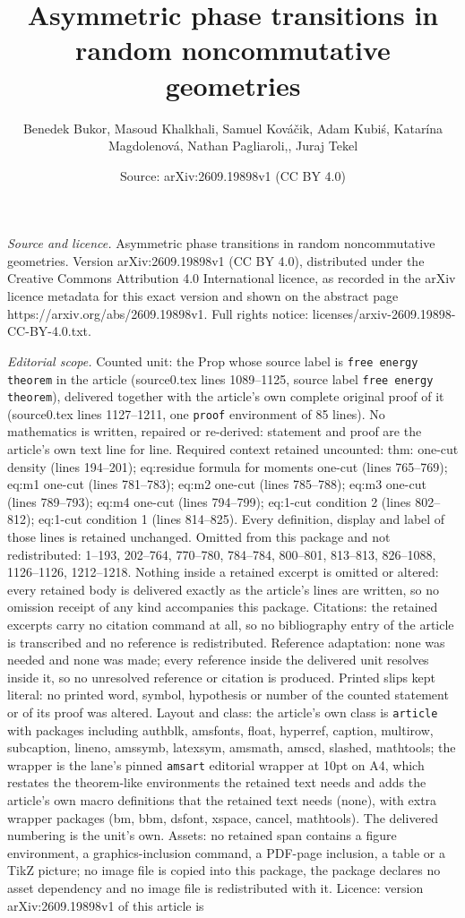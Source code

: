 \documentclass[10pt,a4paper]{amsart}
\title[Asymmetric phase transitions in random noncommutative geomet]{Asymmetric phase transitions in random noncommutative geometries}
\author{Benedek Bukor, Masoud Khalkhali, Samuel Kov\'a\v{c}ik, Adam Kubi\'s, Katar\'ina Magdolenov\'a, Nathan Pagliaroli,, Juraj Tekel}
\date{Source: arXiv:2609.19898v1 (CC BY 4.0)}
\begin{document}
\maketitle

\noindent\emph{Source and licence.} Asymmetric phase transitions in random noncommutative geometries. Version arXiv:2609.19898v1 (CC BY 4.0), distributed under the Creative Commons Attribution 4.0 International licence, as recorded in the arXiv licence metadata for this exact version and shown on the abstract page https://arxiv.org/abs/2609.19898v1. Full rights notice: licenses/arxiv-2609.19898-CC-BY-4.0.txt.\par\smallskip

\noindent\textit{Editorial scope.} Counted unit: the Prop whose source label is \texttt{free energy theorem} in the article (source0.tex lines 1089--1125, source label \texttt{free energy theorem}), delivered together with the article's own complete original proof of it (source0.tex lines 1127--1211, one \texttt{proof} environment of 85 lines). No mathematics is written, repaired or re-derived: statement and proof are the article's own text line for line. Required context retained uncounted: thm: one-cut density (lines 194--201); eq:residue formula for moments one-cut (lines 765--769); eq:m1 one-cut (lines 781--783); eq:m2 one-cut (lines 785--788); eq:m3 one-cut (lines 789--793); eq:m4 one-cut (lines 794--799); eq:1-cut condition 2 (lines 802--812); eq:1-cut condition 1 (lines 814--825). Every definition, display and label of those lines is retained unchanged. Omitted from this package and not redistributed: 1--193, 202--764, 770--780, 784--784, 800--801, 813--813, 826--1088, 1126--1126, 1212--1218. Nothing inside a retained excerpt is omitted or altered: every retained body is delivered exactly as the article's lines are written, so no omission receipt of any kind accompanies this package. Citations: the retained excerpts carry no citation command at all, so no bibliography entry of the article is transcribed and no reference is redistributed. Reference adaptation: none was needed and none was made; every reference inside the delivered unit resolves inside it, so no unresolved reference or citation is produced. Printed slips kept literal: no printed word, symbol, hypothesis or number of the counted statement or of its proof was altered. Layout and class: the article's own class is \texttt{article} with packages including authblk, amsfonts, float, hyperref, caption, multirow, subcaption, lineno, amssymb, latexsym, amsmath, amscd, slashed, mathtools; the wrapper is the lane's pinned \texttt{amsart} editorial wrapper at 10pt on A4, which restates the theorem-like environments the retained text needs and adds the article's own macro definitions that the retained text needs (none), with extra wrapper packages (bm, bbm, dsfont, xspace, cancel, mathtools). The delivered numbering is the unit's own. Assets: no retained span contains a figure environment, a graphics-inclusion command, a PDF-page inclusion, a table or a TikZ picture; no image file is copied into this package, the package declares no asset dependency and no image file is redistributed with it. Licence: version arXiv:2609.19898v1 of this article is 
\end{document}
